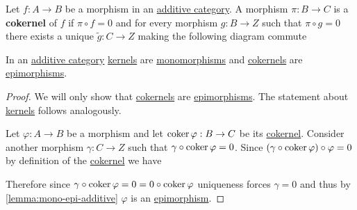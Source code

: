 \documentclass[../../../main]{subfiles}
\begin{document}
\begin{definition}[Cokernel] \label{def:categorical-cokernel}
  Let \(f: A \to B\) be a morphism in an \hyperref[def:additive-category]{additive category}.
  A morphism \(\pi: B \to C\) is a \textbf{cokernel} of \(f\) if \(\pi \circ f = 0\) and for every morphism \(g: B \to Z\) such that \(\pi \circ g = 0\) there exists a unique \(\tilde{g}:C \to Z\) making the following diagram commute
  \begin{center}
  \end{center}
\end{definition}

\begin{lemma} \label{lemma:kernels-cokernels-are-mono-epi}
  In an \hyperref[def:additive-category]{additive category} \hyperref[def:categorical-kernel]{kernels} are \hyperref[def:mono-epi-morphism]{monomorphisms} and \hyperref[def:categorical-cokernel]{cokernels} are \hyperref[def:mono-epi-morphism]{epimorphisms}.
\end{lemma}
\begin{proof}
  We will only show that \hyperref[def:categorical-cokernel]{cokernels} are \hyperref[def:mono-epi-morphism]{epimorphisms}. The statement about \hyperref[def:categorical-kernel]{kernels} follows analogously.

  Let \(\varphi: A \to B\) be a morphism and let \(\operatorname*{coker} \varphi: B \to C\) be its \hyperref[def:categorical-cokernel]{cokernel}.
  Consider another morphism \(\gamma: C \to Z\) such that \(\gamma \circ \operatorname*{coker} \varphi = 0\).
  Since \((\gamma \circ \operatorname*{coker} \varphi) \circ \varphi = 0\) by definition of the \hyperref[def:categorical-cokernel]{cokernel} we have
  \begin{center}
  \end{center}
  Therefore since \(\gamma \circ \operatorname*{coker} \varphi = 0 = 0 \circ \operatorname*{coker} \varphi\) uniqueness forces \(\gamma = 0\) and thus by \autoref{lemma:mono-epi-additive} \(\varphi\) is an \hyperref[def:mono-epi-morphism]{epimorphism}.
\end{proof}
\end{document}
